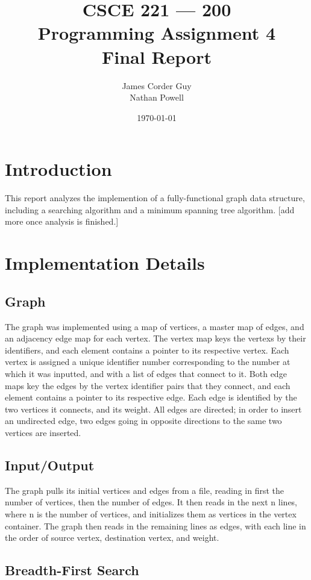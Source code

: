 \documentclass[titlepage]{article}
\title{
	\textbf{
		CSCE 221 --- 200 \\
		Programming Assignment 4 \\
		Final Report
	}
}
\author{
	James Corder Guy \\
	Nathan Powell
}
\date{
	\today
}
\begin{document}
	
	\maketitle
	\begin{multicols}{2}
		\section{Introduction}
                This report analyzes the implemention of a fully-functional graph data structure, including a searching algorithm and a minimum spanning tree algorithm. [add more once analysis is finished.]
		\section{Implementation Details}
			\subsection{Graph}
                        The graph was implemented using a map of vertices, a master map of edges, and an adjacency edge map for each vertex. The vertex map keys the vertexs by their identifiers, and each element contains a pointer to its respective vertex. Each vertex is assigned a unique identifier number corresponding to the number at which it was inputted, and with a list of edges that connect to it. Both edge maps key the edges by the vertex identifier pairs that they connect, and each element contains a pointer to its respective edge. Each edge is identified by the two vertices it connects, and its weight. All edges are directed; in order to insert an undirected edge, two edges going in opposite directions to the same two vertices are inserted.
			\subsection{Input/Output}
                        The graph pulls its initial vertices and edges from a file, reading in first the number of vertices, then the number of edges. It then reads in the next n lines, where n is the number of vertices, and initializes them as vertices in the vertex container. The graph then reads in the remaining lines as edges, with each line in the order of source vertex, destination vertex, and weight.
			\subsection{Breadth-First Search}

\end{multicols}
\end{document}
